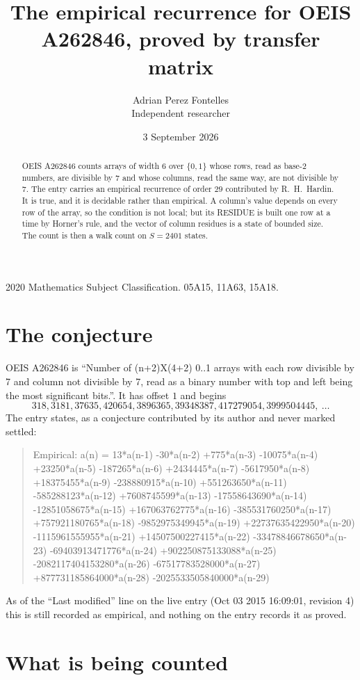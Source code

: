 \documentclass[11pt,a4paper]{article}
\title{The empirical recurrence for OEIS A262846, proved by transfer matrix}
\author{Adrian Perez Fontelles\\ \small Independent researcher}
\date{3 September 2026}
\theoremstyle{plain}
\theoremstyle{definition}
\begin{document}
\maketitle

\begin{abstract}
OEIS A262846 counts arrays of width $6$ over $\{0,1\}$ whose rows, read as base-$2$
numbers, are divisible by $7$ and whose columns, read the same way, are not divisible by
$7$. The entry carries an empirical recurrence of order $29$ contributed by
R.~H.~Hardin. It is true, and it is decidable rather than empirical. A column's value depends on
every row of the array, so the condition is not local; but its RESIDUE is built one row at a
time by Horner's rule, and the vector of column residues is a state of bounded size. The count
is then a walk count on $S=2401$ states.
\end{abstract}

\noindent\small 2020 Mathematics Subject Classification. 05A15, 11A63, 15A18.\normalsize

\section{The conjecture}

OEIS A262846 is ``Number of (n+2)X(4+2) 0..1 arrays with each row divisible by 7 and column not divisible by 7, read as a binary number with top and left being the most significant bits.''. It has offset $1$ and begins
\[
318, 3181, 37635, 420654, 3896365, 39348387, 417279054, 3999504445,\ \dots
\]
The entry states, as a conjecture contributed by its author and never marked settled:
\begin{quote}
Empirical: a(n) = 13*a(n-1) -30*a(n-2) +775*a(n-3) -10075*a(n-4) +23250*a(n-5) -187265*a(n-6) +2434445*a(n-7) -5617950*a(n-8) +18375455*a(n-9) -238880915*a(n-10) +551263650*a(n-11) -585288123*a(n-12) +7608745599*a(n-13) -17558643690*a(n-14) -12851058675*a(n-15) +167063762775*a(n-16) -385531760250*a(n-17) +757921180765*a(n-18) -9852975349945*a(n-19) +22737635422950*a(n-20) -1115961555955*a(n-21) +14507500227415*a(n-22) -33478846678650*a(n-23) -69403913471776*a(n-24) +902250875133088*a(n-25) -2082117404153280*a(n-26) -67517783528000*a(n-27) +877731185864000*a(n-28) -2025533505840000*a(n-29)
\end{quote}
As of the ``Last modified'' line on the live entry (Oct 03 2015 16:09:01, revision 4) this is still
recorded as empirical, and nothing on the entry records it as proved.

\section{What is being counted}
\end{document}
